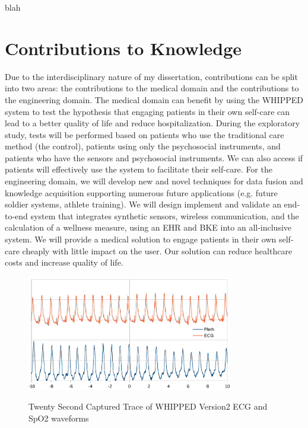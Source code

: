 blah \cite{Chaiyasucheeva2012}
\section{Contributions to Knowledge}
Due to the interdisciplinary nature of my dissertation, contributions can be split into two areas: the contributions to the medical domain and the contributions to the engineering domain. The medical domain can benefit by using the WHIPPED system to test the hypothesis that engaging patients in their own self-care can lead to a better quality of life and reduce hospitalization. During the exploratory study, tests will be performed based on patients who use the traditional care method (the control), patients using only the psychosocial instruments, and patients who have the sensors and psychosocial instruments. We can also access if patients will effectively use the system to facilitate their self-care.
For the engineering domain, we will develop new and novel techniques for data fusion and knowledge acquisition supporting numerous future applications (e.g. future soldier systems, athlete training). We will design implement and validate an end-to-end system that integrates synthetic sensors, wireless communication, and the calculation of a wellness measure, using an EHR and BKE into an all-inclusive system. We will provide a medical solution to engage patients in their own self-care cheaply with little impact on the user. Our solution can reduce healthcare costs and increase quality of life. 

\begin{figure}
	\begin{center}
		\label{fig:20second}
		\includegraphics[scale=1,width=0.8\textwidth]{Images/20second.pdf} 
		\caption[20 second capture]{Twenty Second Captured Trace of WHIPPED Version2 ECG and SpO2 waveforms}
	\end{center}
	
\end{figure}

